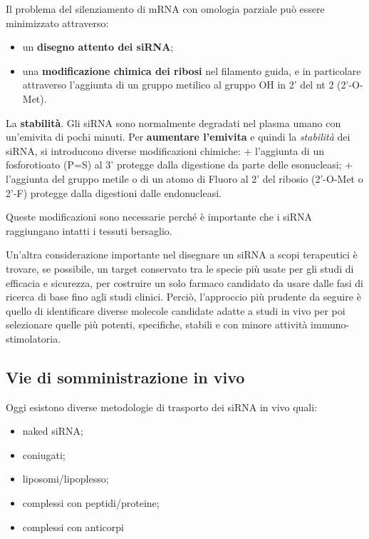 \documentclass[11pt]{book}
\begin{document}
Il problema del silenziamento di mRNA con omologia parziale può essere
minimizzato attraverso:

\begin{itemize}
\itemsep1pt\parskip0pt
\item
  un \textbf{disegno attento dei siRNA};
\item
  una \textbf{modificazione chimica dei ribosi} nel filamento guida, e
  in particolare attraverso l'aggiunta di un gruppo metilico al gruppo
  OH in 2' del nt 2 (2'-O-Met).
\end{itemize}

La \textbf{stabilità}. Gli siRNA sono normalmente degradati nel plasma
umano con un'emivita di pochi minuti. Per \textbf{aumentare l'emivita} e
quindi la \emph{stabilità} dei siRNA, si introducono diverse
modificazioni chimiche: + l'aggiunta di un fosforotioato (P=S) al 3'
protegge dalla digestione da parte delle esonucleasi; + l'aggiunta del
gruppo metile o di un atomo di Fluoro al 2' del ribosio (2'-O-Met o
2'-F) protegge dalla digestioni dalle endonucleasi.

Queste modificazioni sono necessarie perché è importante che i siRNA
raggiungano intatti i tessuti bersaglio.

Un'altra considerazione importante nel disegnare un siRNA a scopi
terapeutici è trovare, se possibile, un target conservato tra le specie
più usate per gli studi di efficacia e sicurezza, per costruire un solo
farmaco candidato da usare dalle fasi di ricerca di base fino agli studi
clinici. Perciò, l'approccio più prudente da seguire è quello di
identificare diverse molecole candidate adatte a studi in vivo per poi
selezionare quelle più potenti, specifiche, stabili e con minore
attività immuno-stimolatoria.

\subsection{Vie di somministrazione in
vivo}\label{vie-di-somministrazione-in-vivo}

Oggi esistono diverse metodologie di trasporto dei siRNA in vivo quali:

\begin{itemize}
\itemsep1pt\parskip0pt
\item
  naked siRNA;
\item
  coniugati;
\item
  liposomi/lipoplesso;
\item
  complessi con peptidi/proteine;
\item
  complessi con anticorpi
\end{itemize}
\end{document}
